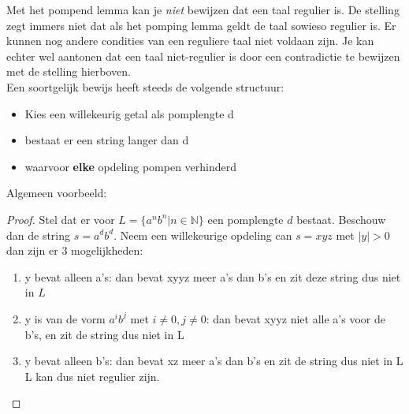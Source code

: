 Met het pompend lemma kan je \emph{niet} bewijzen dat een taal regulier is. De stelling zegt immers niet dat als het pomping lemma geldt de taal sowieso regulier is. Er kunnen nog andere condities van een reguliere taal niet voldaan zijn.
Je kan echter wel aantonen dat een taal niet-regulier is door een contradictie te bewijzen met de stelling hierboven.\\
Een soortgelijk bewijs heeft steeds de volgende structuur:
\begin{itemize}
\item Kies een willekeurig getal als pomplengte d
\item bestaat er een string langer dan d
\item waarvoor \textbf{elke} opdeling pompen verhinderd
\end{itemize}

Algemeen voorbeeld:
\begin{proof}
Stel dat er voor $L= \{a^nb^n | n \in \mathbb{N}\}$ een pomplengte $d$ bestaat. Beschouw dan de string $s=a^db^d$. Neem een willekeurige opdeling can $s=xyz$ met $|y| > 0$ dan zijn er 3 mogelijkheden:
\begin{enumerate}
\item y bevat alleen a's: dan bevat xyyz meer a's dan b's en zit deze string dus niet in $L$
\item y is van de vorm $a^ib^j$ met $i \neq 0, j \neq 0$: dan bevat xyyz niet alle a's voor de b's, en zit de string dus niet in L
\item y bevat alleen b's: dan bevat xz meer a's dan b's en zit de string dus niet in L
L kan dus niet regulier zijn.
\end{enumerate}
\end{proof}
